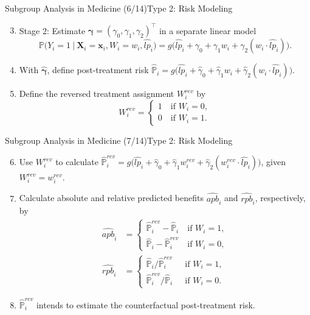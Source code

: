 \documentclass[11pt]{beamer}
\begin{document}
\begin{frame}{Subgroup Analysis in Medicine (6/14)}{Type 2: Risk Modeling}
\begin{enumerate}
\setcounter{enumi}{2}
\item Stage 2: Estimate $\bm{\gamma} = (\gamma_0, \gamma_1, \gamma_2)^\top$ in a \alert{separate} linear model
\[
	\mathbb{P}\Big(Y_i=1\ \Big|\ \mathbf{X}_i = \mathbf{x}_i, W_i = w_i, \hat{lp}_i\Big)
	=
	g\Big(
	\hat{lp}_i + \gamma_0 + \gamma_1 w_i + \gamma_2 (w_i \cdot \hat{lp}_i)
	\Big).
\]
\item With $\bm{\hat{\gamma}}$, define post-treatment risk $\hat{\mathbb{P}}_i = g\Big(
	\hat{lp}_i + \hat{\gamma}_0 + \hat{\gamma}_1 w_i + \hat{\gamma}_2 (w_i \cdot \hat{lp}_i)
	\Big)$.
	\item Define the reversed treatment assignment $W_i^{rev}$ by
\[
	W_i^{rev} = 
	\begin{cases}
	1 \quad \text{if } W_i = 0,\\
	0 \quad \text{if } W_i = 1.
	\end{cases}
\]
\end{enumerate}
\end{frame}


\begin{frame}{Subgroup Analysis in Medicine (7/14)}{Type 2: Risk Modeling}
\begin{enumerate}
\setcounter{enumi}{5}
\item Use $W_i^{rev}$ to calculate $
\hat{\mathbb{P}}_i^{rev} = g\Big(
	\hat{lp}_i + \hat{\gamma}_0 + \hat{\gamma}_1 w_i^{rev} + \hat{\gamma}_2 (w_i^{rev} \cdot \hat{lp}_i)
	\Big)$, given $W_i^{rev} = w_i^{rev}$.
\item Calculate absolute and relative predicted benefits $\widehat{apb}_i$ and $\widehat{rpb}_i$, respectively, by 
\begin{align*}
	\widehat{apb}_i &= 
	\begin{cases}
	\hat{\mathbb{P}}_i^{rev} - \hat{\mathbb{P}}_i \quad \text{if } W_i = 1, \\
	\hat{\mathbb{P}}_i - \hat{\mathbb{P}}_i^{rev} \quad \text{if } W_i = 0,
	\end{cases}
	\\
	\widehat{rpb}_i &= 
	\begin{cases}
	\hat{\mathbb{P}}_i / \hat{\mathbb{P}}_i^{rev} \quad \ \ \text{if } W_i = 1,\\
	\hat{\mathbb{P}}_i^{rev} / \hat{\mathbb{P}}_i \quad \ \ \text{if } W_i = 0.
	\end{cases}	
\end{align*}
\item[\ding{212}] $\hat{\mathbb{P}}_i^{rev}$ intends to estimate the counterfactual post-treatment risk.
\end{enumerate}
\end{frame}
\end{document}
